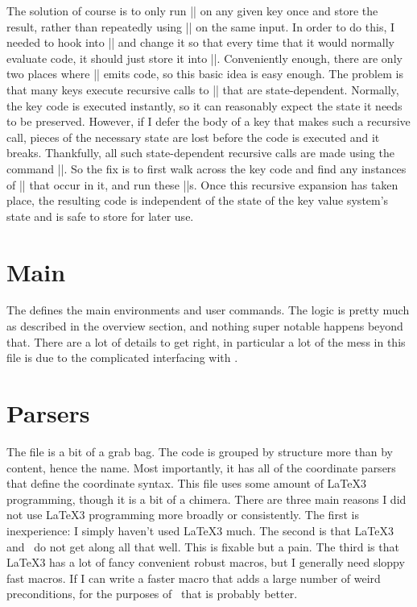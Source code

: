 The solution of course is to only run |\pgfkeys| on any given key once and store the result, rather than repeatedly using |\pgfkeys| on the same input. In order to do this, I needed to hook into |\pgfkeys| and change it so that every time that it would normally evaluate code, it should just store it into |\sseq@savedoptioncode|. Conveniently enough, there are only two places where |\pgfkeys| emits code, so this basic idea is easy enough. The problem is that many keys execute recursive calls to |\pgfkeys| that are state-dependent. Normally, the key code is executed instantly, so it can reasonably expect the state it needs to be preserved. However, if I defer the body of a key that makes such a recursive call, pieces of the necessary state are lost before the code is executed and it breaks. Thankfully, all such state-dependent recursive calls are made using the command |\pgfkeysalso|. So the fix is to first walk across the key code and find any instances of |\pgfkeysalso| that occur in it, and run these |\pgfkeysalso|s. Once this recursive expansion has taken place, the resulting code is independent of the state of the key value system's state and is safe to store for later use.

\section{Main}
The  defines the main environments and user commands. The logic is pretty much as described in the overview section, and nothing super notable happens beyond that. There are a lot of details to get right, in particular a lot of the mess in this file is due to the complicated interfacing with .



\section{Parsers}
The file  is a bit of a grab bag. The code is grouped by structure more than by content, hence the name. Most importantly, it has all of the coordinate parsers that define the coordinate syntax. This file uses some amount of \LaTeX3 programming, though it is a bit of a chimera. There are three main reasons I did not use \LaTeX3 programming more broadly or consistently. The first is inexperience: I simply haven't used \LaTeX3 much. The second is that \LaTeX3 and \tikzname\ do not get along all that well. This is fixable but a pain. The third is that \LaTeX3 has a lot of fancy convenient robust macros, but I generally need sloppy fast macros. If I can write a faster macro that adds a large number of weird preconditions, for the purposes of \spectralsequences\ that is probably better.

